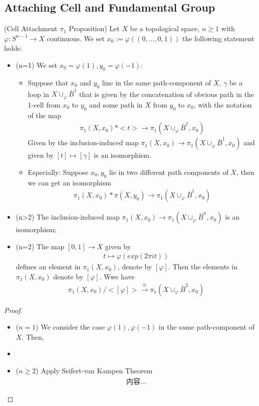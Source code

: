 \documentclass[Total.tex]{subfiles}
\begin{document}
	\subsection{Attaching Cell and Fundamental Group}
	\begin{proposition}
		(Cell Attachment $\pi_1$ Proposition) Let $X$ be a topological space, $n\geq 1$ with $\varphi:S^{n-1}\rightarrow X$ continuous. We set $x_0:=\varphi((0,\dots,0,1))$ the following statement holds:
		\begin{itemize}
			\item (n=1) We set $x_0=\varphi(1),y_0=\varphi(-1)$:
			\begin{itemize}
				\item Suppose that $x_0$ and $y_0$ line in the same path-component of $X$, $\gamma$ be a loop in $X\cup_\varphi \bar{B}^1$ that is given by the concatenation of obvious path in the 1-cell from $x_0$ to $y_0$ and some path in $X$ from $y_0$ to $x_0$, with the notation of the map
				\begin{gather*}
					\pi_1(X,x_0)*<t>\rightarrow \pi_1(X\cup_\varphi \bar{B}^1,x_0)
				\end{gather*}
				Given by the inclusion-induced map $\pi_1(X,x_0)\rightarrow \pi_1(X\cup_\varphi \bar{B}^1,x_0)$ and given by $[t]\mapsto [\gamma]$ is an isomorphism.
				\item Especially: Suppose $x_0,y_0$ lie in two different path components of $X$, then we can get an isomorphism
				\begin{gather*}
					\pi_1(X,x_0)*\pi(X,y_0)\rightarrow \pi_1(X\cup_\varphi \bar{B}^1,x_0)
				\end{gather*}
			\end{itemize}
			\item (n>2) The inclusion-induced map $\pi_1(X,x_0)\rightarrow \pi_1(X\cup_\varphi \bar{B}^n,x_0)$ is an isomorphism;
			\item (n=2) The map $[0,1]\rightarrow X$ given by
			\begin{gather*}
				t\mapsto \varphi(exp(2\pi it))
			\end{gather*}
			defines an element in $\pi_1(X,x_0)$, denote by $[\varphi]$. Then the elements in $\pi_1(X,x_0)$ denote by $[\varphi]$. Wwe have
			\begin{gather*}
				\pi_1(X,x_0)/<[\varphi]>\stackrel{\cong}{\rightarrow} \pi_1(X\cup_\varphi \bar{B}^2,x_0)
			\end{gather*}
		\end{itemize}
	\end{proposition}
	\begin{proof}
		\begin{itemize}
			\item ($n=1$) We consider the case $\varphi(1),\varphi(-1)$ in the same path-component of $X$. Then,
			\item 
			\item ($n\geq 2$) Apply Seifert-van Kampen Theorem
			\begin{gather*}
				内容...
			\end{gather*}
		\end{itemize}
	\end{proof}
	
\end{document}
